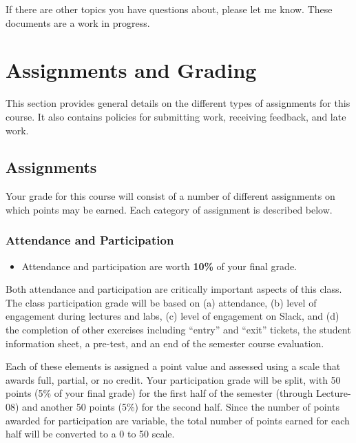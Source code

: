 \documentclass[
]{book}
\newenvironment{rmdblock}[1]
  {\begin{shaded*}
  \begin{itemize}
  \renewcommand{\labelitemi}{
    \raisebox{-.7\height}[0pt][0pt]{
      {\setkeys{Gin}{width=3em,keepaspectratio}\texttt{[image: images/\#1]}}
    }
  }
  \item
  }
  {
  \end{itemize}
  \end{shaded*}
  }
\newenvironment{rmdtip}
  {\begin{rmdblock}{tip}}
  {\end{rmdblock}}
\begin{document}
If there are other topics you have questions about, please let me know. These documents are a work in progress.

\hypertarget{assignments-and-grading}{%
\chapter{Assignments and Grading}\label{assignments-and-grading}}

This section provides general details on the different types of assignments for this course. It also contains policies for submitting work, receiving feedback, and late work.

\hypertarget{assignments}{%
\section{Assignments}\label{assignments}}

Your grade for this course will consist of a number of different assignments on which points may be earned. Each category of assignment is described below.

\hypertarget{attendance-and-participation-1}{%
\subsection{Attendance and Participation}\label{attendance-and-participation-1}}

\begin{rmdtip}
Attendance and participation are worth \textbf{10\%} of your final
grade.
\end{rmdtip}

Both attendance and participation are critically important aspects of this class. The class participation grade will be based on (a) attendance, (b) level of engagement during lectures and labs, (c) level of engagement on Slack, and (d) the completion of other exercises including ``entry'' and ``exit'' tickets, the student information sheet, a pre-test, and an end of the semester course evaluation.

Each of these elements is assigned a point value and assessed using a scale that awards full, partial, or no credit. Your participation grade will be split, with 50 points (5\% of your final grade) for the first half of the semester (through Lecture-08) and another 50 points (5\%) for the second half. Since the number of points awarded for participation are variable, the total number of points earned for each half will be converted to a 0 to 50 scale.
\end{document}
